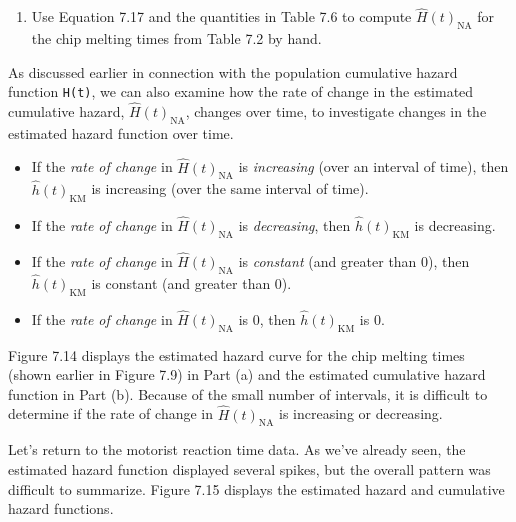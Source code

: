 \documentclass[
]{report}
\providecommand{\tightlist}{%
  \setlength{\itemsep}{0pt}\setlength{\parskip}{0pt}}
\begin{document}
\begin{enumerate}
\def\labelenumi{\arabic{enumi}.}
\setcounter{enumi}{47}
\tightlist
\item
  Use Equation 7.17 and the quantities in Table 7.6 to compute \(\scriptstyle \widehat H(t)_{\mathrm{NA}}\) for the chip melting times from Table 7.2 by hand.
\end{enumerate}

As discussed earlier in connection with the population cumulative hazard function \texttt{H(t)}, we can also examine how the rate of change in the estimated cumulative hazard, \(\scriptstyle \widehat H(t)_{\mathrm{NA}}\), changes over time, to investigate changes in the estimated hazard function over time.

\begin{itemize}
\tightlist
\item
  If the \emph{rate of change} in \(\scriptstyle \widehat H(t)_{\mathrm{NA}}\) is \emph{increasing} (over an interval of time), then \(\scriptstyle \hat h(t)_{\mathrm{KM}}\) is increasing (over the same interval of time).\\
\item
  If the \emph{rate of change} in \(\scriptstyle \widehat H(t)_{\mathrm{NA}}\) is \emph{decreasing}, then \(\scriptstyle \hat h(t)_{\mathrm{KM}}\) is decreasing.\\
\item
  If the \emph{rate of change} in \(\scriptstyle \widehat H(t)_{\mathrm{NA}}\) is \emph{constant} (and greater than 0), then \(\scriptstyle \hat h(t)_{\mathrm{KM}}\) is constant (and greater than 0).\\
\item
  If the \emph{rate of change} in \(\scriptstyle \widehat H(t)_{\mathrm{NA}}\) is 0, then \(\scriptstyle \hat h(t)_{\mathrm{KM}}\) is 0.
\end{itemize}

Figure 7.14 displays the estimated hazard curve for the chip melting times (shown earlier in Figure 7.9) in Part (a) and the estimated cumulative hazard function in Part (b). Because of the small number of intervals, it is difficult to determine if the rate of change in \(\scriptstyle \widehat H(t)_{\mathrm{NA}}\) is increasing or decreasing.

Let's return to the motorist reaction time data. As we've already seen, the estimated hazard function displayed several spikes, but the overall pattern was difficult to summarize. Figure 7.15 displays the estimated hazard and cumulative hazard functions.
\end{document}
